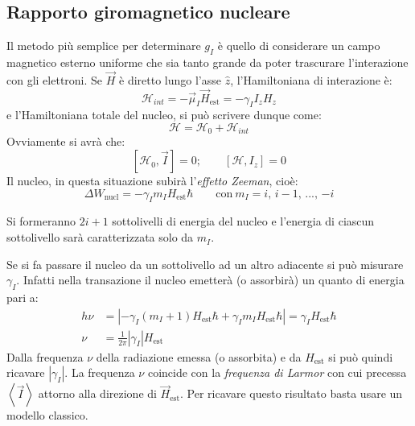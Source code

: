 \subsection{Rapporto giromagnetico nucleare}
Il metodo più semplice per determinare $g_I$ è quello di considerare un campo 
magnetico esterno uniforme che sia tanto grande da poter trascurare 
l'interazione con gli elettroni.
Se $\vec{H}$ è diretto lungo l'asse $\hat{z}$, l'Hamiltoniana di interazione 
è:
\begin{equation}
\mathcal{H}_{int} = - \vec{\mu}_I \vec{H}_\text{est} = - \gamma_I I_z H_z
\end{equation}
e l'Hamiltoniana totale del nucleo, si può scrivere dunque come:
\begin{equation}
\mathcal{H} = \mathcal{H}_0 + \mathcal{H}_{int}
\end{equation}
Ovviamente si avrà che:
\begin{equation}
\left [ \mathcal{H}_0, \vec{I} \right ] = 0; \qquad \left [ \mathcal{H}, I_z 
\right ] = 0
\end{equation}
Il nucleo, in questa situazione subirà l'\textit{effetto Zeeman}, cioè:
\begin{equation}
\Delta W_\text{nucl} = - \gamma_I m_I H_\text{est} \hbar \qquad \text{con}\ m_I 
= \text{$i$, $i-1$, ..., $-i$}
\end{equation}

Si formeranno $2i+1$ sottolivelli di energia del nucleo e l'energia di ciascun
sottolivello sarà caratterizzata solo da $m_I$.

Se si fa passare il nucleo da un sottolivello ad un altro adiacente si può
misurare $\gamma_I$. Infatti nella transazione il nucleo emetterà (o 
assorbirà)
un quanto di energia pari a:
\begin{equation}\begin{split}
h \nu &= \left| - \gamma_I(m_I + 1) H_\text{est} \hbar + \gamma_I m_I 
H_\text{est} \hbar \right| = \gamma_I H_\text{est} \hbar \\
\nu &= \frac{1}{2\pi} \left| \gamma_I \right| H_\text{est}
\end{split}\end{equation}
Dalla frequenza $\nu$ della radiazione emessa (o assorbita) e da $H_\text{est}$ 
si può quindi ricavare $\left| \gamma_I \right|$. La frequenza $\nu$ coincide 
con la \textit{frequenza di Larmor} con cui precessa $\left\langle \vec{I} 
\right\rangle$ attorno alla direzione di $\vec{H}_\text{est}$. Per ricavare 
questo risultato basta usare un modello classico.

